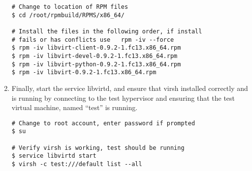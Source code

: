 \begin{enumerate}
\begin{lstlisting}
# Change to location of RPM files
$ cd /root/rpmbuild/RPMS/x86_64/

# Install the files in the following order, if install
# fails or has conflicts use   rpm -iv --force   
$ rpm -iv libvirt-client-0.9.2-1.fc13.x86_64.rpm 
$ rpm -iv libvirt-devel-0.9.2-1.fc13.x86_64.rpm
$ rpm -iv libvirt-python-0.9.2-1.fc13.x86_64.rpm
$ rpm -iv libvirt-0.9.2-1.fc13.x86_64.rpm
\end{lstlisting}

\item 	Finally, start the service libvirtd, and ensure that virsh installed correctly and is running by 
		connecting to the test hypervisor and ensuring that the test virtual machine, named ``test'' is running.

\lstset{language=bash,caption=Verify virsh was Installed Properly}
\begin{lstlisting}
# Change to root account, enter password if prompted
$ su

# Verify virsh is working, test should be running
$ service libvirtd start
$ virsh -c test:///default list --all
\end{lstlisting}
\end{enumerate}




